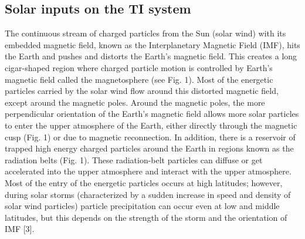 \subsection{Solar inputs on the TI system}
The continuous stream of charged particles from the Sun (solar wind) with its embedded magnetic field, known as the Interplanetary Magnetic Field (IMF), hits the Earth and pushes and distorts the Earth’s magnetic field. This creates a long cigar-shaped region where charged particle motion is controlled by Earth’s magnetic field called the magnetosphere (see Fig. 1). Most of the energetic particles carried by the solar wind flow around this distorted magnetic field, except around the magnetic poles. Around the magnetic poles, the more perpendicular orientation of the Earth’s magnetic field allows more solar particles to enter the upper atmosphere of the Earth, either directly through the magnetic cusp (Fig. 1) or due to magnetic reconnection. In addition, there is a reservoir of trapped high energy charged particles around the Earth in regions known as the radiation belts (Fig. 1). These radiation-belt particles can diffuse or get accelerated into the upper atmosphere and interact with the upper atmosphere. Most of the entry of the energetic particles occurs at high latitudes; however, during solar storms (characterized by a sudden increase in speed and density of solar wind particles) particle precipitation can occur even at low and middle latitudes, but this depends on the strength of the storm and the orientation of IMF [3]. 

  

